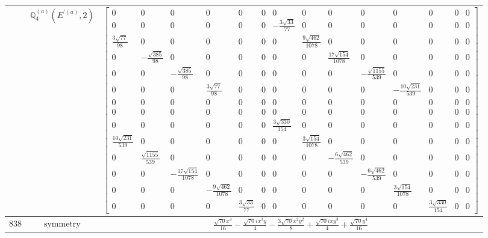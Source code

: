 \documentclass[fleqn,8pt,landscape]{jsarticle}
\begin{document}
\begin{longtable}{ccc}
$  $ & $ \mathbb{Q}_{4}^{(a)}(E^{\prime(a)},2) $ & $ \begin{bmatrix} 0 & 0 & 0 & 0 & 0 & 0 & 0 & 0 & 0 & 0 & 0 & 0 & 0 & 0 \\ 0 & 0 & 0 & 0 & 0 & 0 & - \frac{3 \sqrt{33}}{77} & 0 & 0 & 0 & 0 & 0 & 0 & 0 \\ \frac{3 \sqrt{77}}{98} & 0 & 0 & 0 & 0 & 0 & 0 & \frac{9 \sqrt{462}}{1078} & 0 & 0 & 0 & 0 & 0 & 0 \\ 0 & - \frac{\sqrt{385}}{98} & 0 & 0 & 0 & 0 & 0 & 0 & \frac{17 \sqrt{154}}{1078} & 0 & 0 & 0 & 0 & 0 \\ 0 & 0 & - \frac{\sqrt{385}}{98} & 0 & 0 & 0 & 0 & 0 & 0 & - \frac{\sqrt{1155}}{539} & 0 & 0 & 0 & 0 \\ 0 & 0 & 0 & \frac{3 \sqrt{77}}{98} & 0 & 0 & 0 & 0 & 0 & 0 & - \frac{10 \sqrt{231}}{539} & 0 & 0 & 0 \\ 0 & 0 & 0 & 0 & 0 & 0 & 0 & 0 & 0 & 0 & 0 & 0 & 0 & 0 \\ 0 & 0 & 0 & 0 & 0 & 0 & 0 & 0 & 0 & 0 & 0 & 0 & 0 & 0 \\ 0 & 0 & 0 & 0 & 0 & 0 & \frac{3 \sqrt{330}}{154} & 0 & 0 & 0 & 0 & 0 & 0 & 0 \\ \frac{10 \sqrt{231}}{539} & 0 & 0 & 0 & 0 & 0 & 0 & \frac{3 \sqrt{154}}{1078} & 0 & 0 & 0 & 0 & 0 & 0 \\ 0 & \frac{\sqrt{1155}}{539} & 0 & 0 & 0 & 0 & 0 & 0 & - \frac{6 \sqrt{462}}{539} & 0 & 0 & 0 & 0 & 0 \\ 0 & 0 & - \frac{17 \sqrt{154}}{1078} & 0 & 0 & 0 & 0 & 0 & 0 & - \frac{6 \sqrt{462}}{539} & 0 & 0 & 0 & 0 \\ 0 & 0 & 0 & - \frac{9 \sqrt{462}}{1078} & 0 & 0 & 0 & 0 & 0 & 0 & \frac{3 \sqrt{154}}{1078} & 0 & 0 & 0 \\ 0 & 0 & 0 & 0 & \frac{3 \sqrt{33}}{77} & 0 & 0 & 0 & 0 & 0 & 0 & \frac{3 \sqrt{330}}{154} & 0 & 0 \end{bmatrix} $ \\ \hline
$ 838 $ & $ \text{symmetry} $ & $ \frac{\sqrt{70} x^{4}}{16} - \frac{\sqrt{70} i x^{3} y}{4} - \frac{3 \sqrt{70} x^{2} y^{2}}{8} + \frac{\sqrt{70} i x y^{3}}{4} + \frac{\sqrt{70} y^{4}}{16} $ \\

\end{longtable}
\end{document}
